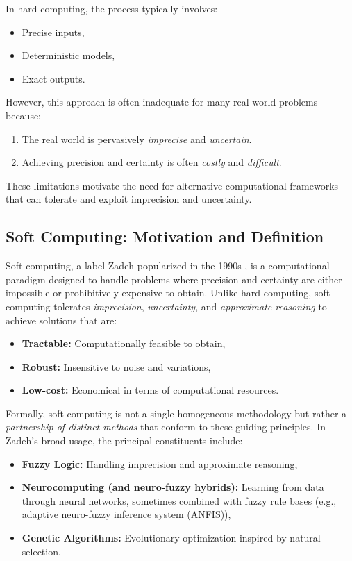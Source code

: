 In hard computing, the process typically involves:
\begin{itemize}
    \item Precise inputs,
    \item Deterministic models,
    \item Exact outputs.
\end{itemize}

However, this approach is often inadequate for many real-world problems because:
\begin{enumerate}
    \item The real world is pervasively \emph{imprecise} and \emph{uncertain}.
    \item Achieving precision and certainty is often \emph{costly} and \emph{difficult}.
\end{enumerate}

These limitations motivate the need for alternative computational frameworks that can tolerate and exploit imprecision and uncertainty.

\subsection{Soft Computing: Motivation and Definition}
\label{sec:softcomp_soft_computing_motivation_and_definition}

Soft computing, a label Zadeh popularized in the 1990s \citep{Zadeh1994}, is a computational paradigm designed to handle problems where precision and certainty are either impossible or prohibitively expensive to obtain. Unlike hard computing, soft computing tolerates \emph{imprecision}, \emph{uncertainty}, and \emph{approximate reasoning} to achieve solutions that are:
\begin{itemize}
    \item \textbf{Tractable:} Computationally feasible to obtain,
    \item \textbf{Robust:} Insensitive to noise and variations,
    \item \textbf{Low-cost:} Economical in terms of computational resources.
\end{itemize}

Formally, soft computing is not a single homogeneous methodology but rather a \emph{partnership of distinct methods} that conform to these guiding principles. In Zadeh's broad usage, the principal constituents include:
\begin{itemize}
    \item \textbf{Fuzzy Logic:} Handling imprecision and approximate reasoning,
    \item \textbf{Neurocomputing (and neuro-fuzzy hybrids):} Learning from data through neural networks, sometimes combined with fuzzy rule bases (e.g., adaptive neuro-fuzzy inference system (ANFIS)),
    \item \textbf{Genetic Algorithms:} Evolutionary optimization inspired by natural selection.
\end{itemize}

